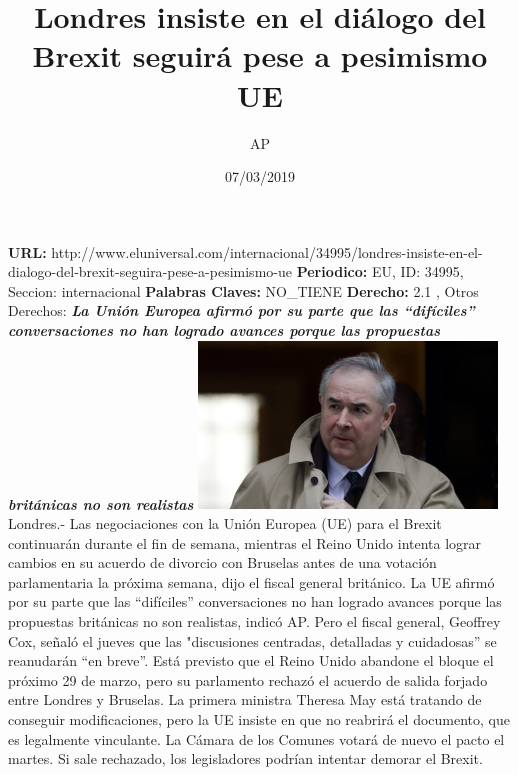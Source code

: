 \documentclass{article}%
\title{\textbf{Londres insiste en el diálogo del Brexit seguirá pese a pesimismo UE}}%
\author{AP}%
\date{07/03/2019}%
\begin{document}
%
\normalsize%
\maketitle%
\textbf{URL: }%
http://www.eluniversal.com/internacional/34995/londres{-}insiste{-}en{-}el{-}dialogo{-}del{-}brexit{-}seguira{-}pese{-}a{-}pesimismo{-}ue\newline%
%
\textbf{Periodico: }%
EU, %
ID: %
34995, %
Seccion: %
internacional\newline%
%
\textbf{Palabras Claves: }%
NO\_TIENE\newline%
%
\textbf{Derecho: }%
2.1%
, Otros Derechos: %
\newline%
%
\textbf{\textit{La Unión Europea afirmó por su parte que las “difíciles” conversaciones no han logrado avances porque las propuestas británicas no son realistas}}%
\newline%
\newline%
%
\includegraphics[width=300px]{EU_34995.jpg}%
\newline%
%
Londres.{-} Las negociaciones con la Unión Europea (UE) para el Brexit continuarán durante el fin de semana, mientras el Reino Unido intenta lograr cambios en su acuerdo de divorcio con Bruselas antes de una votación parlamentaria la próxima semana, dijo el fiscal general británico.%
\newline%
%
La UE afirmó por su parte que las “difíciles” conversaciones no han logrado avances porque las propuestas británicas no son realistas, indicó AP.%
\newline%
%
Pero el fiscal general, Geoffrey Cox, señaló el jueves que las "discusiones centradas, detalladas y cuidadosas” se reanudarán “en breve”.%
\newline%
%
Está previsto que el Reino Unido abandone el bloque el próximo 29 de marzo, pero su parlamento rechazó el acuerdo de salida forjado entre Londres y Bruselas.%
\newline%
%
La primera ministra Theresa May está tratando de conseguir modificaciones, pero la UE insiste en que no reabrirá el documento, que es legalmente vinculante.%
\newline%
%
La Cámara de los Comunes votará de nuevo el pacto el martes. Si sale rechazado, los legisladores podrían intentar demorar el Brexit.%
\newline%
%
\end{document}
